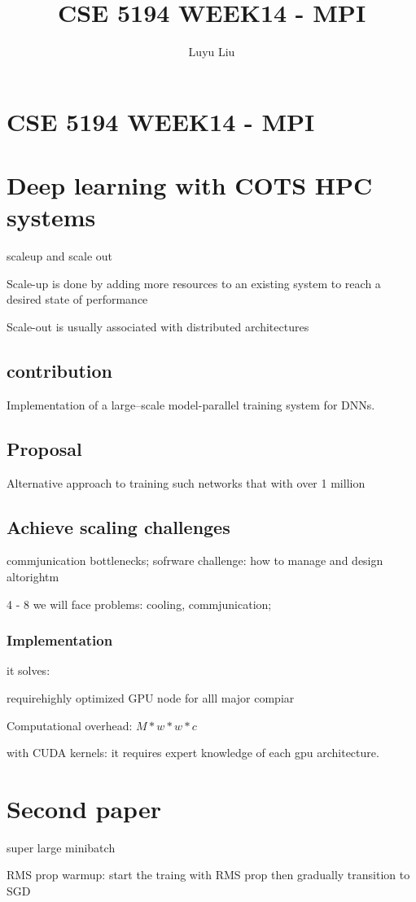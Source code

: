 \documentclass[12pt]{article}
\begin{document}
\author{Luyu Liu}

\newcommand\para{\par\refstepcounter{para}\thepara\space}

\section*{CSE 5194 WEEK14 - MPI}
\title{CSE 5194 WEEK14 - MPI}

\section{Deep learning with COTS HPC systems}
scaleup and scale out

Scale-up is done by adding more resources to an existing system to reach a desired state of performance

Scale-out is usually associated with distributed architectures

\subsection{contribution}
Implementation of a large--scale model-parallel training system for DNNs.

\subsection{Proposal}
Alternative approach to training such networks that with over 1 million

\subsection{Achieve scaling challenges}
commjunication bottlenecks; sofrware challenge: how to manage and design altorightm

4 - 8 we will face problems: cooling, commjunication;

\subsubsection{Implementation}
it solves:

requirehighly optimized GPU node for alll major compiar 

Computational overhead: $M * w*w*c$

with CUDA kernels: it requires expert knowledge of each gpu architecture.

\section{Second paper}
super large minibatch

RMS prop warmup: start the traing with RMS prop then gradually transition to SGD
\end{document}
